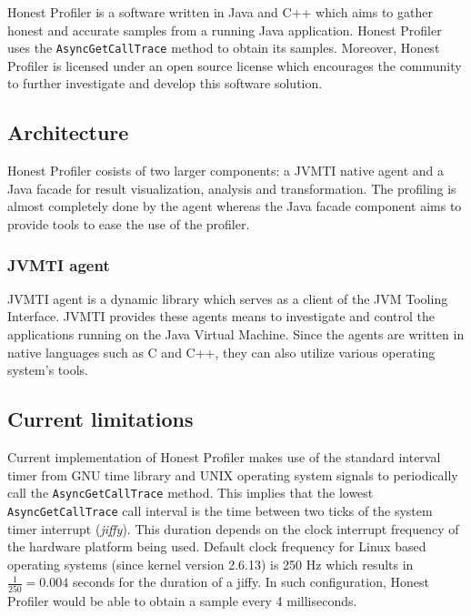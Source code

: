 \documentclass[..thesis.tex]{subfiles}
\begin{document}

Honest Profiler \cite{hon_prof} is a software written in Java and C++ which aims to gather honest and accurate samples from a running Java application. Honest Profiler uses the \texttt{AsyncGetCallTrace} method to obtain its samples. Moreover, Honest Profiler is licensed under an open source license which encourages the community to further investigate and develop this software solution.

\subsection{Architecture}
Honest Profiler cosists of two larger components: a JVMTI native agent and a Java facade for result visualization, analysis and transformation. The profiling is almost completely done by the agent whereas the Java facade component aims to provide tools to ease the use of the profiler.

\subsubsection{JVMTI agent}
JVMTI agent is a dynamic library which serves as a client of the JVM Tooling Interface. JVMTI provides these agents means to investigate and control the applications running on the Java Virtual Machine. Since the agents are written in native languages such as C and C++, they can also utilize various operating system's tools.



\subsection{Current limitations}
Current implementation of Honest Profiler makes use of the standard interval timer from GNU time library and UNIX operating system signals to periodically call the \texttt{AsyncGetCallTrace} method. This implies that the lowest \texttt{AsyncGetCallTrace} call interval is the time between two ticks of the system timer interrupt (\textit{jiffy}). This duration depends on the clock interrupt frequency of the hardware platform being used. Default clock frequency for Linux based operating systems (since kernel version 2.6.13) is 250 Hz which results in $\frac{1}{250} = 0.004$ seconds for the duration of a jiffy. \cite{linux_time} In such configuration, Honest Profiler would be able to obtain a sample every 4 milliseconds.
\end{document}
